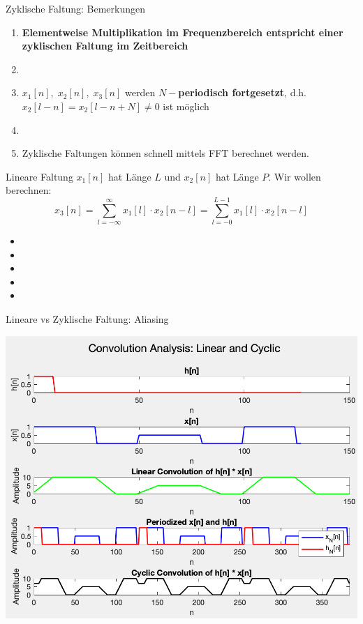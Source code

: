 \documentclass[14pt, aspectratio=169, handout]{beamer}
\begin{document}
\begin{frame}{Zyklische Faltung: Bemerkungen}
    \begin{enumerate}
    \item \textbf{Elementweise Multiplikation im Frequenzbereich entspricht einer zyklischen Faltung im Zeitbereich}
    \item[] 
    \item $x_1[n], \; x_2[n], \; x_3[n]$ werden \textbf{$N-$periodisch fortgesetzt}, d.h. $x_2[l-n] = x_2[l-n+N] \neq 0$ ist möglich
    \item[]
    \item Zyklische Faltungen können schnell mittels FFT berechnet werden.
\end{enumerate}
\end{frame}

\begin{frame}{Lineare Faltung}
    $x_1[n]$ hat Länge $L$ und $x_2[n]$ hat Länge $P$. Wir wollen berechnen:
    $$ x_3[n] = \sum_{l=-\infty}^\infty x_1[l]\cdot x_2[n-l] = \sum_{l=-0}^{L-1} x_1[l]\cdot x_2[n-l] $$
    \begin{itemize}
        \item[] 
        \item[] 
        \item[] 
        \item[] 
        \item[] 
    \end{itemize}
\end{frame}

\begin{frame}{Lineare vs Zyklische Faltung: Aliasing}
    \noindent
    \begin{minipage}{0.6\textwidth}
        \includegraphics[width=\linewidth]{figures/conv_alias.png}
    \end{minipage}
    \hfill
    \begin{minipage}{0.35\textwidth}
        
    \end{minipage}
\end{frame}
\end{document}
